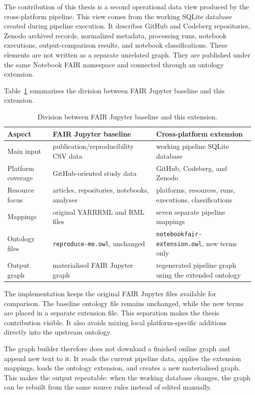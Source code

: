 The contribution of this thesis is a second operational data view produced by the cross-platform pipeline. This view comes from the working SQLite database created during pipeline execution. It describes GitHub and Codeberg repositories, Zenodo archived records, normalized metadata, processing runs, notebook executions, output-comparison results, and notebook classifications. These elements are not written as a separate unrelated graph. They are published under the same Notebook FAIR namespace and connected through an ontology extension.

Table~\ref{tab:fairjupyter-division} summarises the division between FAIR Jupyter baseline and this extension.

\begin{table}[ht]
\centering
\caption{Division between FAIR Jupyter baseline and this extension.}
\label{tab:fairjupyter-division}
\small
\begin{tabularx}{\textwidth}{@{}p{2.6cm}XX@{}}
\toprule
Aspect & FAIR Jupyter baseline & Cross-platform extension\tabularnewline
\midrule
Main input & publication/reproducibility CSV data & working pipeline SQLite database\tabularnewline
Platform coverage & GitHub-oriented study data & GitHub, Codeberg, and Zenodo\tabularnewline
Resource focus & articles, repositories, notebooks, analyses & platforms, resources, runs, executions, classifications\tabularnewline
Mappings & original YARRRML and RML files & seven separate pipeline mappings\tabularnewline
Ontology files & \texttt{reproduce-me.owl}, unchanged & \texttt{notebookfair-extension.owl}, new terms only\tabularnewline
Output graph & materialised FAIR Jupyter graph & regenerated pipeline graph using the extended ontology\tabularnewline
\bottomrule
\end{tabularx}
\end{table}

The implementation keeps the original FAIR Jupyter files available for comparison. The baseline ontology file remains unchanged, while the new terms are placed in a separate extension file. This separation makes the thesis contribution visible. It also avoids mixing local platform-specific additions directly into the upstream ontology.

The graph builder therefore does not download a finished online graph and append new text to it. It reads the current pipeline data, applies the extension mappings, loads the ontology extension, and creates a new materialised graph. This makes the output repeatable: when the working database changes, the graph can be rebuilt from the same source rules instead of edited manually.

